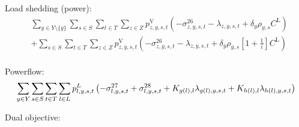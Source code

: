 \documentclass{article}
\newcommand{\sYears}{Y}
\newcommand{\sScenarios}{S}
\newcommand{\sIntervals}{T}
\newcommand{\sZones}{Z}
\newcommand{\sLinks}{L}
\newcommand{\iYear}{y}
\newcommand{\iYearTerminal}{\overline{\iYear}}
\newcommand{\iScenario}{s}
\newcommand{\iInterval}{t}
\newcommand{\iZone}{z}
\newcommand{\iLink}{l}
\newcommand{\cScenarioDuration}[1][\iYear,\iScenario]{\rho_{#1}}
\newcommand{\cInterestRate}{i}
\newcommand{\cIncidenceMatrix}[1][\iZone,\iLink]{K_{#1}}
\newcommand{\cLostLoadCost}{C^{\mathrm{L}}}
\newcommand{\cDiscountRate}[1][\iYear]{\delta_{#1}}
\newcommand{\vPowerFlow}[1][\iLink,\iYear,\iScenario,\iInterval]{p^{\sLinks}_{#1}}
\newcommand{\vLostLoadEnergy}[1][\iZone,\iYear,\iScenario,\iInterval]{e^{\mathrm{V}}_{#1}}
\newcommand{\vLostLoadPower}[1][\iZone,\iYear,\iScenario,\iInterval]{p^{\mathrm{V}}_{#1}}
\newcommand{\dNonNegativeLostLoad}[1][\iZone,\iYear,\iScenario,\iInterval]{\sigma_{#1}^{26}}
\newcommand{\dMinPowerFlow}[1][\iLink,\iYear,\iScenario,\iInterval]{\sigma_{#1}^{27}}
\newcommand{\dMaxPowerFlow}[1][\iLink,\iYear,\iScenario,\iInterval]{\sigma_{#1}^{28}}
\newcommand{\dPowerBalance}[1][\iZone,\iYear,\iScenario,\iInterval]{\lambda_{#1}}
\newcommand{\dLostLoadEnergy}[1][\iZone,\iYear,\iScenario,\iInterval]{\zeta_{#1}^{4}}
\begin{document}
Load shedding (power):
\begin{align}
	& \sum\limits_{\iYear \in \sYears 
		\setminus \{\iYearTerminal\}
	} \sum\limits_{\iScenario \in \sScenarios} \sum\limits_{\iInterval \in \sIntervals} \sum\limits_{\iZone \in \sZones} \vLostLoadPower \left(- \dNonNegativeLostLoad - \dPowerBalance + \cDiscountRate \cScenarioDuration \cLostLoadCost\right)\\
	& + \sum\limits_{\iScenario \in \sScenarios} \sum\limits_{\iInterval \in \sIntervals} \sum\limits_{\iZone \in \sZones} \vLostLoadPower[\iZone,\iYearTerminal,\iScenario,\iInterval] \left(- \dNonNegativeLostLoad[\iZone,\iYearTerminal,\iScenario,\iInterval] - \dPowerBalance[\iZone,\iYearTerminal,\iScenario,\iInterval] + \cDiscountRate[\iYearTerminal] \cScenarioDuration[\iYearTerminal,\iScenario] \left[1 + \frac{1}{\cInterestRate}\right] \cLostLoadCost\right)\\
\end{align}


Powerflow:
\begin{equation}
	\sumIntervals \sum\limits_{\iLink \in \sLinks} \vPowerFlow \left(-\dMinPowerFlow + \dMaxPowerFlow + \cIncidenceMatrix[g(\iLink), \iLink] \dPowerBalance[g(\iLink),\iYear,\iScenario,\iInterval] + \cIncidenceMatrix[h(\iLink), \iLink] \dPowerBalance[h(\iLink),\iYear,\iScenario,\iInterval]\right)
\end{equation}

Dual objective:
\end{document}
